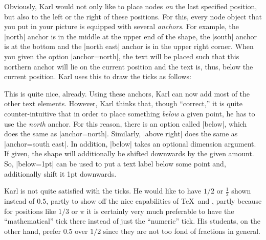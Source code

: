 Obviously, Karl would not only like to place nodes \emph{on} the last
specified position, but also to the left or the 
right of these positions. For this, every node object that you
put in your picture is equipped with several \emph{anchors}. For
example, the |north| anchor is in the middle at the upper end of the shape,
the |south| anchor is at the bottom and the |north east| anchor is in
the upper right corner. When you given the option |anchor=north|, the
text will be placed such that this northern anchor will lie on the
current position and the text is, thus, below the current
position. Karl uses this to draw the ticks as follows:

\begin{codeexample}[]
\end{codeexample}

This is quite nice, already. Using these anchors, Karl can now add
most of the other text elements. However, Karl thinks that, though
``correct,'' it is quite counter-intuitive that in order to place something
\emph{below} a given point, he has to use the \emph{north} anchor. For
this reason, there is an option called |below|, which does the
same as |anchor=north|. Similarly, |above right| does the same as
|anchor=south east|. In addition, |below| takes an optional
dimension argument. If given, the shape will additionally be shifted
downwards by the given amount. So, |below=1pt| can be used to put
a text label below some point and, additionally shift it  1pt
downwards. 

Karl is not quite satisfied with the ticks. He would like to have
$1/2$ or $\frac{1}{2}$ shown instead of $0.5$, partly to show off the
nice capabilities of \TeX\ and \tikzname, partly because for positions
like $1/3$ or $\pi$ it is certainly very much preferable to have the
``mathematical'' tick there instead of just the ``numeric'' tick.
His students, on the other hand, prefer $0.5$ over $1/2$
since they are not too fond of fractions in general.

